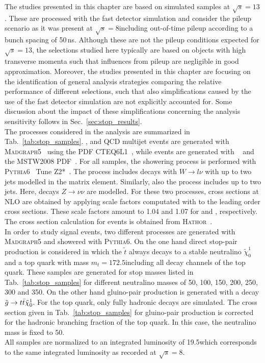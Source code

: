 The studies presented in this chapter are based on simulated samples at $\sqrt{s} = 13$\tev. These are processed with the fast detector simulation and consider the pileup scenario as it was present at $\sqrt{s} = 8$\tev including out-of-time pileup according to a bunch spacing of 50\,ns. Although these are not the pileup conditions expected for $\sqrt{s} = 13$\tev, the selections studied here typically are based on objects with high transverse momenta such that influences from pileup are negligible in good approximation. Moreover, the studies presented in this chapter are focusing on the identification of general analysis strategies comparing the relative performance of different selections, such that also simplifications caused by the use of the fast detector simulation are not explicitly accounted for. Some discussion about the impact of these simplifications concerning the analysis sensitivity follows in Sec.~\ref{sec:stop_results}.  \\
The processes considered in the analysis are summarized in Tab.~\ref{tab:stop_samples}. \WJets, \ZJets and QCD multijet events are generated with \textsc{Madgraph5}~\cite{Alwall:2014hca} using the PDF CTEQ6L1~\cite{Pumplin:2002vw}, while \ttbar events are generated with \powheg~\cite{Oleari:2010nx} and the MSTW2008 PDF~\cite{Martin:2009iq}. For all samples, the showering process is performed with \textsc{Pythia6}~\cite{Sjostrand:2006za} Tune Z2*~\cite{Chatrchyan:2013gfi}. The process \WJets includes decays with $W \rightarrow l \nu$ with up to two jets modelled in the matrix element. Similarly, also the process \ZJets includes up to two jets. Here, decays $Z \rightarrow \nu \nu$ are modelled. For these two processes, cross sections at NLO are obtained by applying scale factors computated with \powheg to the leading order cross sections. These scale factors amount to 1.04 and 1.07 for \WJets and \ZJets, respectively. The cross section calculation for \ttbar events is obtained from \textsc{Hathor}~\cite{Aliev:2010zk}. \\
In order to study signal events, two different processes are generated with \textsc{Madgraph5} and showered with \textsc{Pythia6}. On the one hand direct stop-pair production is considered in which the $\tilde{t}$ always decays to a stable neutralino $\tilde{\chi}_{0}^{1}$ and a top quark with mass $m_{t} = 172.5$\gev including all decay channels of the top quark. These samples are generated for stop masses listed in Tab.~\ref{tab:stop_samples} for different neutralino masses of 50, 100, 150, 200, 250, 300 and 350\gev. On the other hand gluino-pair production is generated with a decay $\tilde{g} \rightarrow t\bar{t} \tilde{\chi}_{0}^{1}$. For the top quark, only fully hadronic decays are simulated. The cross section given in Tab.~\ref{tab:stop_samples} for gluino-pair production is corrected for the hadronic branching fraction of the top quark. In this case, the neutralino mass is fixed to 50\gev. \\
All samples are normalized to an integrated luminosity of 19.5\fbinv which corresponds to the same integrated luminosity as recorded at $\sqrt{s} =8$\tev.

